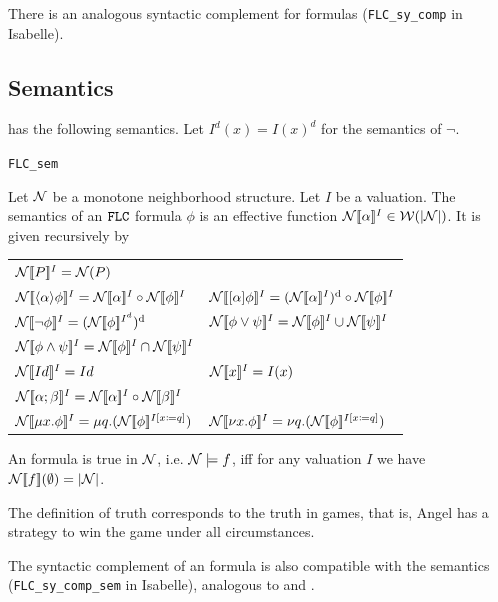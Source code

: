 There is an analogous syntactic complement for \FLC{} formulas (\texttt{FLC\_sy\_comp} in Isabelle).

\subsection{Semantics}
\FLC{} has the following semantics. Let $I^d(x) = I(x)^d$ for the semantics of $\neg$.

\begin{bdefinition}
\texttt{FLC\_sem}

    Let $\mathcal N$ be a monotone neighborhood structure. Let $I$ be a valuation. The semantics of an $\texttt{FLC}{}$ formula $\phi$ is an effective function $\mathcal N[\![\alpha]\!]^I\in \mathcal W(|\mathcal N|)$. It is given recursively by
    
    \begin{tabular}{l l}
        $\mathcal N[\![ P]\!]^I = \mathcal N(P)$ \\
        $\mathcal N[\![ \langle\alpha\rangle\phi]\!]^I = \mathcal N[\![\alpha]\!]^I\circ \mathcal N[\![\phi]\!]^I$ 
        & $\mathcal N[\![ [\alpha]\phi]\!]^I = (\mathcal N[\![\alpha]\!]^I)^\text{d} \circ\mathcal N[\![\phi]\!]^I$ \\
        $\mathcal N[\![ \neg\phi]\!]^I = (\mathcal N[\![ \phi]\!]^{I^d})^\text{d}$ 
        & $\mathcal N[\![ \phi\vee\psi]\!]^I=\mathcal N[\![\phi]\!]^I\cup \mathcal N[\![\psi]\!]^I$ \\
        $\mathcal N[\![ \phi\wedge\psi]\!]^I=\mathcal N[\![\phi]\!]^I\cap \mathcal N[\![\psi]\!]^I$ \\
        $\mathcal N[\![ Id]\!]^I= Id$ 
        & $\mathcal N[\![ x ]\!]^I = I(x)$ \\
        $\mathcal N[\![\alpha;\beta]\!]^I=\mathcal N[\![ \alpha]\!]^I\circ \mathcal N[\![\beta]\!]^I$ \\
        $\mathcal N[\![ \mu x. \phi]\!]^I=\mu q.(\mathcal N[\![ \phi]\!]^{I[x\coloneq q]})$ 
        & $\mathcal N[\![ \nu x. \phi]\!]^I=\nu q.(\mathcal N[\![ \phi]\!]^{I[x\coloneq q]})$  \\
    \end{tabular}

\medskip

An \FLC{} formula is true in $\mathcal N$, i.e. $\mathcal N\models f$, iff for any valuation $I$ we have $\mathcal N [\![ f]\!] (\emptyset) = |\mathcal N|$.
\end{bdefinition}

The definition of truth corresponds to the truth in games, that is, Angel has a strategy to win the game under all circumstances.

The syntactic complement of an \FLC{} formula is also compatible with the semantics (\texttt{FLC\_sy\_comp\_sem} in Isabelle), analogous to \GLs{} and \RGL{}.

